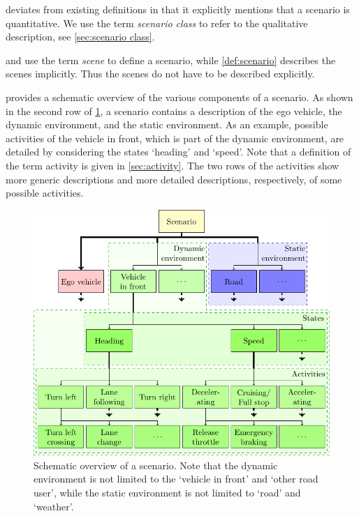  deviates from existing definitions \cite{geyer2014, ulbrich2015, elrofai2016scenario} in that it explicitly mentions that a scenario is quantitative. We use the term \emph{scenario class} to refer to the qualitative description, see \cref{sec:scenario class}.

\textcite{geyer2014} and \textcite{ulbrich2015} use the term \emph{scene} to define a scenario, while \cref{def:scenario} describes the scenes implicitly. Thus the scenes do not have to be described explicitly.

 provides a schematic overview of the various components of a scenario. As shown in the second row of \cref{fig:scenario}, a scenario contains a description of the ego vehicle, the dynamic environment, and the static environment. As an example, possible activities of the vehicle in front, which is part of the dynamic environment, are detailed by considering the states `heading' and `speed'. Note that a definition of the term activity is given in \cref{sec:activity}. The two rows of the activities show more generic descriptions and more detailed descriptions, respectively, of some possible activities.

\begin{figure}
	\centering
	\includegraphics[width=\linewidth]{figures/scenario.pdf}%
	\caption{Schematic overview of a scenario. Note that the dynamic environment is not limited to the `vehicle in front' and `other road user', while the static environment is not limited to `road' and `weather'.}
	\label{fig:scenario}
\end{figure}



